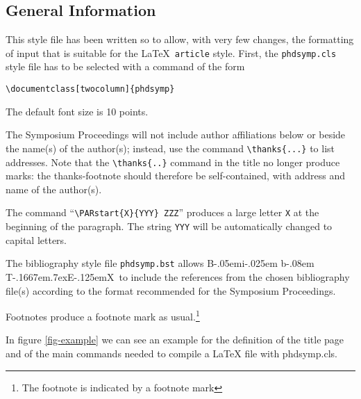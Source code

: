 \documentclass[twocolumn]{phdsymp} %
\def\BibTeX{{\rm B\kern-.05em{\sc i\kern-.025em b}\kern-.08em
    T\kern-.1667em\lower.7ex\hbox{E}\kern-.125emX}}
\begin{document}
\subsection{General Information}
This style file has been written so to allow, with very few changes,
the formatting of input that is suitable for the \LaTeX\ {\tt article}
style.
First,  the \verb+phdsymp.cls+ style file has to be
selected with a command of the form
\begin{center}
\verb+\documentclass[twocolumn]{phdsymp}+
\end{center}

The default font size is 10 points.  

The Symposium Proceedings will not include author affiliations below or beside
the name(s) of the author(s); instead, use the command \verb+\thanks{...}+ to
list addresses. Note that the \verb+\thanks{..}+ command in the title no longer
produce marks: the thanks-footnote should therefore be self-contained, with
address and name of the author(s).

The command ``\verb+\PARstart{X}{YYY} ZZZ+'' produces a large letter
\verb+X+ at the beginning of the paragraph. The string \verb+YYY+
will be automatically changed to capital letters.

The bibliography style file {\tt phdsymp.bst} allows \BibTeX\ to include
the references from the chosen bibliography file(s) according to the
format recommended for the Symposium Proceedings.

Footnotes produce a footnote mark as usual.\footnote{The footnote is
indicated by a footnote mark}


In figure \ref{fig-example} we can see an example for the definition of
the title page and of the main commands needed to compile a \LaTeX
file with phdsymp.cls.
\end{document}
